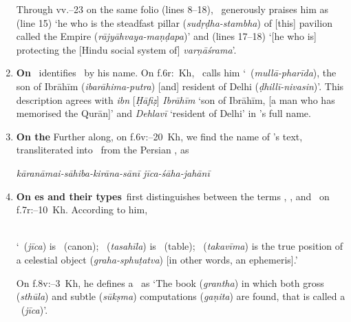 \begin{enumerate}[topsep=0pt]
     Through vv.--23 on the same folio (lines 8--18), \Nityananda\ generously praises him as
      (line 15) `he who is the steadfast pillar (\textit{sudṛḍha-stambha}) of [this] pavilion called the Empire (\textit{rājyāhvaya-maṇḍapa})' and  (lines 17--18) `[he who is] protecting the [Hindu social system of] \textit{varṇāśrama}'.  
    \item \textbf{On \MullaFarid}\quad \label{mulla_farid_sanskrit_sidhantasindhu}\Nityananda\ identifies \MullaFarid\ by his name. On f.\thinspace 6r:~Kh, \Nityananda\ calls him  `\MullaFarid\ (\textit{mullā-pharīda}), the son of Ibrāhīm (\textit{ibarāhima-putra}) [and] resident of Delhi (\textit{ḍhillī-nivasin})'. This description agrees with \textit{ibn} [\textit{Ḥāfiẓ}] \textit{Ibrāhīm} `son of Ibrāhīm, [a man who has memorised the Qur\Alif ān]' and \textit{Dehlavī} `resident of Delhi' in \MullaFarid's full name. 
     \item \textbf{On the \ZijiShahJahani}\quad \label{zij_shahjahani_sanskrit_siddhantasindhu}
    Further along, on f.\thinspace 6v:--20~Kh, we find the name of \MullaFarid's text, transliterated into \Nagari\ from the Persian \ZijiShahJahanifull, as
    \begin{multicols}{2}
     \columnbreak
    
     \textit{kāranāmai-sāhiba-kirāna-sānī \newline jīca-śāha-jahānī}
    \end{multicols}
    \item \textbf{On \zij es and their types}\label{zij_types_defintion_siddhantasindhu}\quad    \Nityananda\ first distinguishes between the terms \zij, \tashil, and \taqvim\ on f.\thinspace 7r:--10~Kh. According to him,
    {\par
    \\
    `\zij\ (\textit{jīca}) is \Siddhanta\ (canon); \tashil\ (\textit{tasahīla}) is \sarani\ (table); \taqvim\ (\textit{takavīma}) is the true position of a celestial object (\textit{graha-sphuṭatva}) [in other words, an ephemeris].'\par}
    On f.\thinspace 8v:--3~Kh, he defines a \zij\ as  `The book (\textit{grantha}) in which both gross (\textit{sthūla}) and subtle (\textit{sūkṣma}) computations (\textit{gaṇita}) are found, that is called a \zij\ (\textit{jīca})'.   
    

\end{enumerate}
